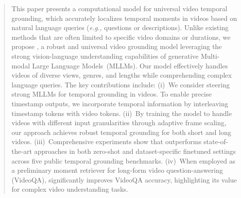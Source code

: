 \begin{abstract}
This paper presents a computational model for universal video temporal grounding, which accurately localizes temporal moments in videos based on natural language queries ({\em e.g.,} questions or descriptions). 
Unlike existing methods that are often limited to specific video domains or durations, we propose \textbf{\Model{}}, a robust and universal video grounding model leveraging the strong vision-language understanding capabilities of generative Multi-modal Large Language Models~(MLLMs).
Our model effectively handles videos of diverse views, genres, and lengths while comprehending complex language queries.
The key contributions include:
(i)~We consider steering strong MLLMs for temporal grounding in videos. To enable precise timestamp outputs, we incorporate temporal information by interleaving timestamp tokens with video tokens.
(ii)~By training the model to handle videos with different input granularities through adaptive frame scaling, our approach achieves robust temporal grounding for both short and long videos.
(iii)~Comprehensive experiments show that \Model{} outperforms state-of-the-art approaches in both zero-shot and dataset-specific finetuned settings across five public temporal grounding benchmarks.
(iv)~When employed as a preliminary moment retriever for long-form video question-answering (VideoQA), \Model{} significantly improves VideoQA accuracy, highlighting its value for complex video understanding tasks.
\end{abstract}
